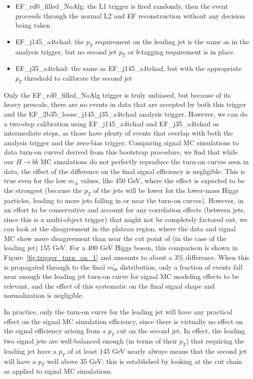 \begin{itemize}
    \item EF\_rd0\_filled\_NoAlg: the L1 trigger is fired randomly, then the event proceeds
    through the normal L2 and EF reconstruction without any decision being taken
    \item EF\_j145\_a4tchad: the $p_T$ requirement on the leading jet is the same as in 
    the analysis trigger, but no second jet $p_T$ or $b$-tagging requirement is in place
    \item EF\_j35\_a4tchad: the same as EF\_j145\_a4tchad, but with the appropriate $p_T$ 
    threshold to calibrate the second jet
\end{itemize}

Only the EF\_rd0\_filled\_NoAlg trigger is truly unbiased, but because of its heavy prescale,
there are no events in data that are accepted by both this trigger and the EF\_2b35\_loose\_j145\_j35\_a4tchad
analysis trigger.  However, we can do a two-step calibration using EF\_j145\_a4tchad and
EF\_j35\_a4tchad as intermediate steps, as those have plenty of events that overlap 
with both the analysis trigger and the zero-bias trigger.  Comparing signal MC simulations
to data turn-on curved derived from this bootstrap procedure, we find that while our $H\rightarrow b\bar{b}$  MC
simulations do not perfectly reproduce the turn-on curves seen in data, the effect of the
difference on the final signal efficiency is negligible.  This is true even for the low $m_A$
values, like 450 GeV, where the effect is expected to be the strongest (because the $p_T$ of the
jets will be lower for the lower-mass Higgs particles, leading to more jets falling in or near
the turn-on curves).  However, in an effort to be conservative and account for any correlation
effects (between jets, since this is a multi-object trigger) that might not be completely factored
out, we can look at the disagreement in the plateau region, where the data and signal MC
show more disagreement than near the cut point of (in the case of the leading jet) 155 GeV.
For a 400 GeV Higgs boson, this comparison is shown in Figure~\ref{fig:trigger_turn_on_1}
and amounts to about a 3\% difference.  When this is propagated through to the final $m^{'}_{bb}$
distribution, only a fraction of events fall near enough the leading jet turn-on curve for 
signal MC modeling effects to be relevant, and the effect of this systematic on the final
signal shape and normalization is negligible.



In practice, only the turn-on curve for the leading jet will have any practical effect
on the signal MC simulation efficiency, since there is virtually no effect on the signal efficiency
arising from a $p_T$ cut on the second jet.  In effect, the leading two signal jets are
well-balanced enough (in terms of their $p_T$) that requiring the leading jet have a $p_T$ of
at least 145 GeV nearly always means that the second jet will have a $p_T$ well above 35 GeV;
this is established by looking at the cut chain as applied to signal MC simulations.



